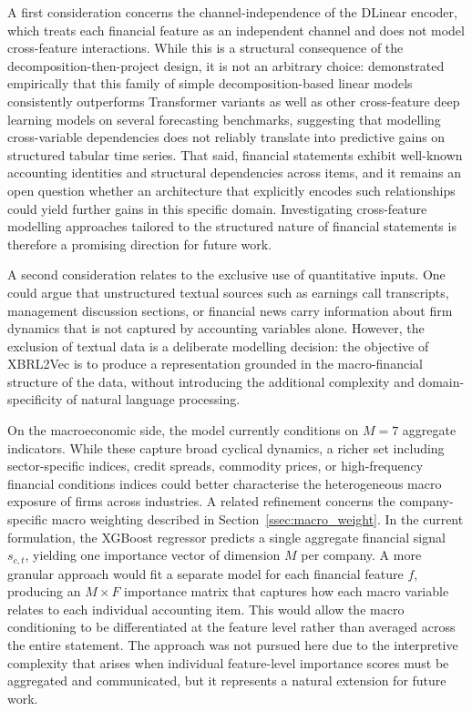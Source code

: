 \documentclass[a4paper,fleqn]{cas-dc}
\begin{document}
A first consideration concerns the channel-independence of the DLinear encoder, which treats each financial feature as an independent channel and does not model cross-feature interactions.  While this is a structural consequence of the decomposition-then-project design, it is not an arbitrary choice: \citet{zeng_are_2023} demonstrated empirically that this family of simple decomposition-based linear models consistently outperforms Transformer variants as well as other cross-feature deep learning models on several forecasting benchmarks, suggesting that modelling cross-variable dependencies does not reliably translate into predictive gains on structured tabular time series.  That said, financial statements exhibit well-known accounting identities and structural dependencies across items, and it remains an open question whether an architecture that explicitly encodes such relationships could yield further gains in this specific domain.  Investigating cross-feature modelling approaches tailored to the structured nature of financial statements is therefore a promising direction for future work.

A second consideration relates to the exclusive use of quantitative inputs.  One could argue that unstructured textual sources such as earnings call transcripts, management discussion sections, or financial news carry information about firm dynamics that is not captured by accounting variables alone.  However, the exclusion of textual data is a deliberate modelling decision: the objective of XBRL2Vec is to produce a representation grounded in the macro-financial structure of the data, without introducing the additional complexity and domain-specificity of natural language processing.

On the macroeconomic side, the model currently conditions on $M=7$ aggregate indicators.  While these capture broad cyclical dynamics, a richer set including sector-specific indices, credit spreads, commodity prices, or high-frequency financial conditions indices could better characterise the heterogeneous macro exposure of firms across industries.  A related refinement concerns the company-specific macro weighting described in Section~\ref{ssec:macro_weight}.  In the current formulation, the XGBoost regressor predicts a single aggregate financial signal $s_{c,t}$, yielding one importance vector of dimension $M$ per company.  A more granular approach would fit a separate model for each financial feature $f$, producing an $M \times F$ importance matrix that captures how each macro variable relates to each individual accounting item.  This would allow the macro conditioning to be differentiated at the feature level rather than averaged across the entire statement.  The approach was not pursued here due to the interpretive complexity that arises when individual feature-level importance scores must be aggregated and communicated, but it represents a natural extension for future work.
\end{document}
